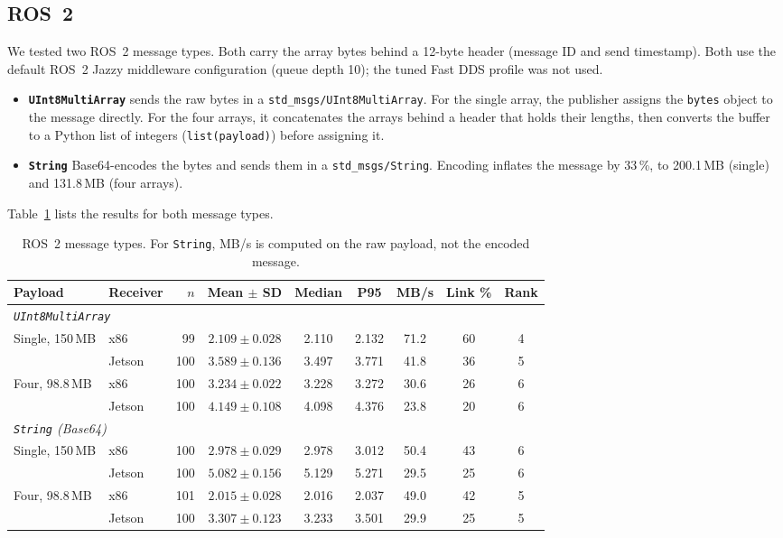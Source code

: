 \subsection{ROS~2}
\label{sec:res-ros2}

We tested two ROS~2 message types. Both carry the array bytes behind a 12-byte header
(message ID and send timestamp). Both use the default ROS~2 Jazzy middleware
configuration (queue depth 10); the tuned Fast DDS profile was not used.
\begin{itemize}
  \item \textbf{\texttt{UInt8MultiArray}} sends the raw bytes in a
  \texttt{std\_msgs/\allowbreak{}UInt8MultiArray}. For the single array, the publisher
  assigns the \texttt{bytes} object to the message directly. For the four arrays, it
  concatenates the arrays behind a header that holds their lengths, then converts the
  buffer to a Python list of integers (\texttt{list(payload)}) before assigning it.
  \item \textbf{\texttt{String}} Base64-encodes the bytes and sends them in a
  \texttt{std\_msgs/\allowbreak{}String}. Encoding inflates the message by 33\,\%, to
  200.1\,MB (single) and 131.8\,MB (four arrays).
\end{itemize}
Table~\ref{tab:ros2} lists the results for both message types.

\begin{table}[t]
  \centering
  \caption{ROS~2 message types. For \texttt{String}, MB/s is computed on the raw
  payload, not the encoded message.}
  \label{tab:ros2}
  \small
  \setlength{\tabcolsep}{4pt}
  \begin{tabular}{llrcccccc}
    \toprule
    Payload & Receiver & $n$ & Mean $\pm$ SD & Median & P95 & MB/s & Link \% & Rank \\
    \midrule
    \multicolumn{9}{l}{\textit{\texttt{UInt8MultiArray}}} \\
    Single, 150\,MB & x86    &  99 & $2.109 \pm 0.028$ & 2.110 & 2.132 & 71.2 & 60 & 4 \\
                    & Jetson & 100 & $3.589 \pm 0.136$ & 3.497 & 3.771 & 41.8 & 36 & 5 \\
    Four, 98.8\,MB  & x86    & 100 & $3.234 \pm 0.022$ & 3.228 & 3.272 & 30.6 & 26 & 6 \\
                    & Jetson & 100 & $4.149 \pm 0.108$ & 4.098 & 4.376 & 23.8 & 20 & 6 \\
    \midrule
    \multicolumn{9}{l}{\textit{\texttt{String} (Base64)}} \\
    Single, 150\,MB & x86    & 100 & $2.978 \pm 0.029$ & 2.978 & 3.012 & 50.4 & 43 & 6 \\
                    & Jetson & 100 & $5.082 \pm 0.156$ & 5.129 & 5.271 & 29.5 & 25 & 6 \\
    Four, 98.8\,MB  & x86    & 101 & $2.015 \pm 0.028$ & 2.016 & 2.037 & 49.0 & 42 & 5 \\
                    & Jetson & 100 & $3.307 \pm 0.123$ & 3.233 & 3.501 & 29.9 & 25 & 5 \\
    \bottomrule
  \end{tabular}
\end{table}


